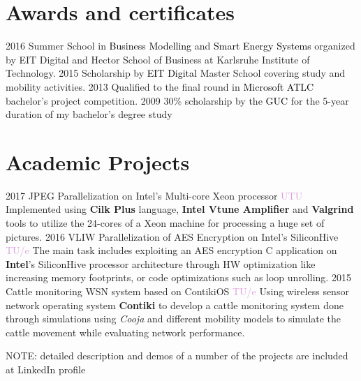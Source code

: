 \documentclass[letterpaper]{twentysecondcv}
\begin{document}
\section{Awards and certificates}
\begin{twentyshort}
  \twentyitemshort
    {2016}
    {\small Summer School in \textcolor{black}{Business Modelling} and \textcolor{black}{Smart Energy Systems} organized by EIT Digital and Hector School of Business at Karlsruhe Institute of Technology.}
  \twentyitemshort
    {2015}
    {\small Scholarship by \textcolor{black}{EIT Digital} Master School covering study and mobility activities.}
  \twentyitemshort
    {2013}
    {\small Qualified to the final round in \textcolor{black}{Microsoft ATLC} bachelor's project competition.}
  \twentyitemshort
    {2009}
    {\small 30\% scholarship by the \textcolor{black}{GUC} for the 5-year duration of my bachelor's degree study}

\end{twentyshort}


\section{Academic Projects}
\begin{twenty}
  \twentyitem
     {2017}
    {JPEG Parallelization on Intel's Multi-core Xeon processor}
    {\textcolor{Plum}{UTU}}
    {\small{Implemented using \textbf{Cilk Plus} language, \textbf{Intel Vtune Amplifier} and \textbf{Valgrind} tools to utilize the 24-cores of a Xeon machine for processing a huge set of pictures.}}
   \twentyitem
    {2016}
    {VLIW Parallelization of AES Encryption on Intel's SiliconHive}
    {\textcolor{Plum}{TU/e}}
    {\small{The main task includes exploiting an AES encryption C application on \textbf{Intel}'s SiliconHive processor architecture through HW optimization like increasing memory footprints, or code optimizations such as loop unrolling.}}
   \twentyitem
    {2015}
    {Cattle monitoring WSN system based on ContikiOS}
    {\textcolor{Plum}{TU/e}}
    {\small{Using wireless sensor network operating system \textbf{Contiki} to develop a cattle monitoring system done through simulations using \textit{Cooja} and different mobility models to simulate the cattle movement while evaluating network performance.}}
\end{twenty}
\footnotesize{NOTE: detailed description and demos of a number of the projects are included at LinkedIn profile}
\end{document}
